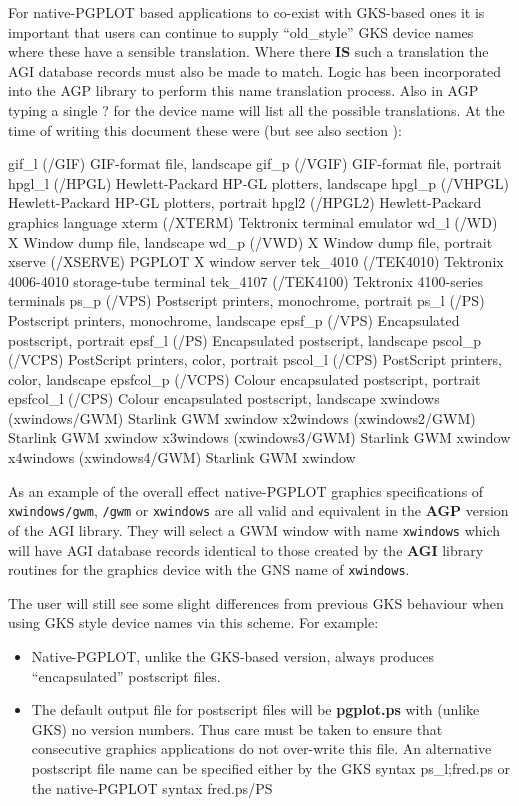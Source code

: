 \documentclass[twoside,11pt]{starlink}
\begin{document}
For native-PGPLOT based applications to co-exist with GKS-based ones
it is important that users can continue to supply ``old\_style'' GKS device
names where these have a sensible translation. Where there \textbf{IS} such
a translation the AGI  database records must also be made to match.
Logic has been incorporated into the AGP library to perform this name
translation process.
Also in AGP typing a single ? for the device name will list all the possible
translations. At the time of writing this document these were (but see also
section ):
\begin{terminalv}
gif_l     (/GIF)           GIF-format file, landscape
gif_p     (/VGIF)          GIF-format file, portrait
hpgl_l    (/HPGL)          Hewlett-Packard HP-GL plotters, landscape
hpgl_p    (/VHPGL)         Hewlett-Packard HP-GL plotters, portrait
hpgl2     (/HPGL2)         Hewlett-Packard graphics language
xterm     (/XTERM)         Tektronix terminal emulator
wd_l      (/WD)            X Window dump file, landscape
wd_p      (/VWD)           X Window dump file, portrait
xserve    (/XSERVE)        PGPLOT X window server
tek_4010  (/TEK4010)       Tektronix 4006-4010 storage-tube terminal
tek_4107  (/TEK4100)       Tektronix 4100-series terminals
ps_p      (/VPS)           Postscript printers, monochrome, portrait
ps_l      (/PS)            Postscript printers, monochrome, landscape
epsf_p    (/VPS)           Encapsulated postscript, portrait
epsf_l    (/PS)            Encapsulated postscript, landscape
pscol_p   (/VCPS)          PostScript printers, color, portrait
pscol_l   (/CPS)           PostScript printers, color, landscape
epsfcol_p (/VCPS)          Colour encapsulated postscript, portrait
epsfcol_l (/CPS)           Colour encapsulated postscript, landscape
xwindows  (xwindows/GWM)   Starlink GWM xwindow
x2windows (xwindows2/GWM)  Starlink GWM xwindow
x3windows (xwindows3/GWM)  Starlink GWM xwindow
x4windows (xwindows4/GWM)  Starlink GWM xwindow
\end{terminalv}

As an example of the overall effect native-PGPLOT graphics
specifications of {\tt xwindows/gwm}, {\tt \//gwm} or {\tt xwindows}
are all valid and equivalent in the {\bf AGP} version of the AGI
library. They will select a GWM window with name {\tt xwindows} which
will have AGI database records identical to those created by the {\bf
AGI} library routines for the graphics device with the GNS name of
{\tt xwindows}.

The user will still see some slight differences from previous GKS behaviour
when using GKS style device names via this scheme. For example:
\begin{itemize}
\item Native-PGPLOT, unlike the GKS-based version, always produces
``encapsulated'' postscript files.
\item The default output file for postscript files will be \textbf{pgplot.ps}
with (unlike GKS) no version numbers.  Thus care must be taken to ensure
that consecutive graphics applications do not over-write this file. An
alternative postscript file name can be specified either by the GKS
syntax ps\_l;fred.ps or the native-PGPLOT syntax fred.ps/PS
\end{itemize}
\end{document}
